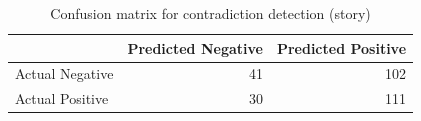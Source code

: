 \begin{table}
\caption{Confusion matrix for contradiction detection (story)}
\label{tab:confusion_matrix}
\begin{tabular}{lrr}
\toprule
 & Predicted Negative & Predicted Positive \\
\midrule
Actual Negative & 41 & 102 \\
Actual Positive & 30 & 111 \\
\bottomrule
\end{tabular}
\end{table}
